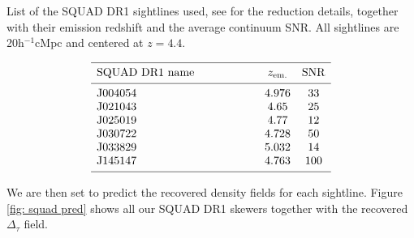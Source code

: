 \begin{table}
    \caption[]{List of the SQUAD DR1 sightlines used, see \cite{Murphy_2018} for the reduction details, together with their emission redshift and the average continuum SNR.     
    All sightlines are 20h$^{-1}$cMpc and centered at $z=4.4$.}
    \label{tab: squad dr1}
   $$ 
       \begin{array}{p{0.4\textwidth}cc}
          \hline
          \noalign{\smallskip}
          SQUAD DR1 name &  z_{\mathrm{em.}} & \mathrm{SNR} \\ 
          \noalign{\smallskip}
          \hline
          \noalign{\smallskip}
          J004054 &4.976  & 33    \\
          J021043           &4.65   &25\\
          J025019     &4.77   &     12      \\
          J030722     &4.728        &   50          \\
          J033829 &  5.032             &  14         \\
          J145147  & 4.763                 &  100         \\
          \noalign{\smallskip}
          \hline
       \end{array}
   $$ 
 \end{table}


We are then set to predict the recovered density fields for each sightline. Figure \ref{fig: squad pred} shows all our SQUAD DR1 skewers together with the recovered $\Delta_\tau$ field.

